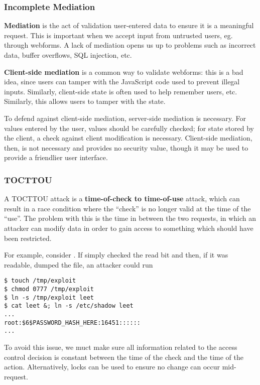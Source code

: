 \documentclass[12pt]{article}
\begin{document}
\subsubsection{Incomplete Mediation}
{\bf Mediation} is the act of validation user-entered data to ensure it is a meaningful request. This is important when we accept input from untrusted users, eg. through webforms. A lack of mediation opens us up to problems such as incorrect data, buffer overflows, SQL injection, etc.

{\bf Client-side mediation} is a common way to validate webforms: this is a bad idea, since users can tamper with the JavaScript code used to prevent illegal inputs. Similarly, client-side state is often used to help remember users, etc. Similarly, this allows users to tamper with the state.

To defend against client-side mediation, server-side mediation is necessary. For values entered by the user, values should be carefully checked; for state stored by the client, a check against client modification is necessary. Client-side mediation, then, is not necessary and provides no security value, though it may be used to provide a friendlier user interface.

\subsubsection{TOCTTOU}
A TOCTTOU attack is a {\bf time-of-check to time-of-use} attack, which can result in a race condition where the ``check'' is no longer valid at the time of the ``use''. The problem with this is the time in between the two requests, in which an attacker can modify data in order to gain access to something which should have been restricted.

For example, consider . If  simply checked the read bit and then, if it was readable, dumped the file, an attacker could run

\begin{verbatim}
$ touch /tmp/exploit
$ chmod 0777 /tmp/exploit
$ ln -s /tmp/exploit leet
$ cat leet &; ln -s /etc/shadow leet
...
root:$6$PASSWORD_HASH_HERE:16451::::::
...
\end{verbatim}

To avoid this issue, we muct make sure all information related to the access control decision is constant between the time of the check and the time of the action. Alternatively, locks can be used to ensure no change can occur mid-request.
\end{document}

